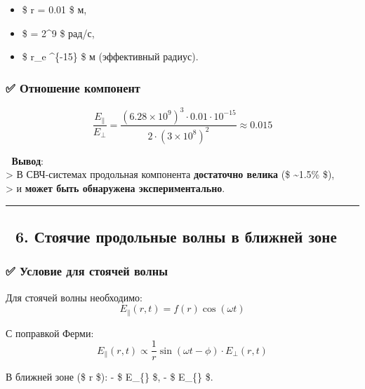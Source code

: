 \documentclass[11pt]{article}
\providecommand{\tightlist}{%
      \setlength{\itemsep}{0pt}\setlength{\parskip}{0pt}}
\begin{document}
\begin{itemize}
\tightlist
\item
  \$ r = 0.01 \$ м,
\item
  \$ \omega = 2\pi {}\^{}9 \$ рад/с,
\item
  \$ r\_e \^{}\{-15\} \$ м (эффективный радиус).
\end{itemize}

\subsubsection{✅ Отношение
компонент}\label{ux43eux442ux43dux43eux448ux435ux43dux438ux435-ux43aux43eux43cux43fux43eux43dux435ux43dux442}

\[
\frac{E_{\parallel}}{E_{\perp}} = \frac{(6.28 \times 10^9)^3 \cdot 0.01 \cdot 10^{-15}}{2 \cdot (3 \times 10^8)^2} \approx 0.015
\]

📌 \textbf{Вывод}:\\
\textgreater{} В СВЧ-системах продольная компонента \textbf{достаточно
велика} (\$ \sim 1.5\% \$),\\
\textgreater{} и \textbf{может быть обнаружена экспериментально}.

\begin{center}\rule{0.5\linewidth}{\linethickness}\end{center}

\subsection{🔹 6. Стоячие продольные волны в ближней
зоне}\label{ux441ux442ux43eux44fux447ux438ux435-ux43fux440ux43eux434ux43eux43bux44cux43dux44bux435-ux432ux43eux43bux43dux44b-ux432-ux431ux43bux438ux436ux43dux435ux439-ux437ux43eux43dux435}

\subsubsection{✅ Условие для стоячей
волны}\label{ux443ux441ux43bux43eux432ux438ux435-ux434ux43bux44f-ux441ux442ux43eux44fux447ux435ux439-ux432ux43eux43bux43dux44b}

Для стоячей волны необходимо: \[
E_{\parallel}(r, t) = f(r) \cos(\omega t)
\]

С поправкой Ферми: \[
E_{\parallel}(r, t) \propto \frac{1}{r} \sin(\omega t - \phi) \cdot E_{\perp}(r, t)
\]

В ближней зоне (\$ r \ll \lambda \$): - \$ E\_\{\perp\}
\propto {} \$, - \$ E\_\{\parallel\} \propto {}
\$.
\end{document}

